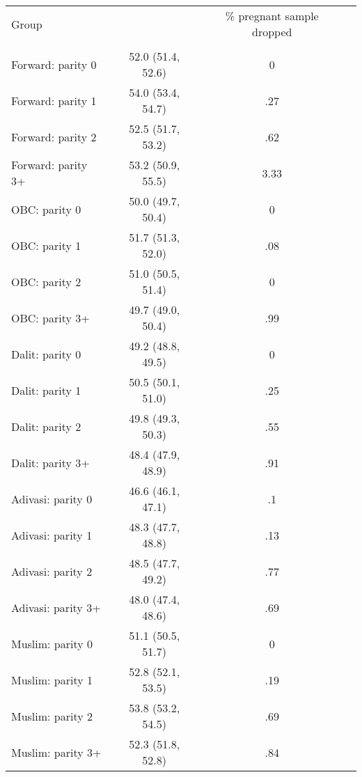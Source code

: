 \begin{tabular}{lccc}
\toprule
Group &  & \% pregnant sample dropped \\\\
\midrule
Forward: parity 0&52.0 (51.4, 52.6)&0\\
Forward: parity 1&54.0 (53.4, 54.7)&.27\\
Forward: parity 2&52.5 (51.7, 53.2)&.62\\
Forward: parity 3+&53.2 (50.9, 55.5)&3.33\\
OBC: parity 0&50.0 (49.7, 50.4)&0\\
OBC: parity 1&51.7 (51.3, 52.0)&.08\\
OBC: parity 2&51.0 (50.5, 51.4)&0\\
OBC: parity 3+&49.7 (49.0, 50.4)&.99\\
Dalit: parity 0&49.2 (48.8, 49.5)&0\\
Dalit: parity 1&50.5 (50.1, 51.0)&.25\\
Dalit: parity 2&49.8 (49.3, 50.3)&.55\\
Dalit: parity 3+&48.4 (47.9, 48.9)&.91\\
Adivasi: parity 0&46.6 (46.1, 47.1)&.1\\
Adivasi: parity 1&48.3 (47.7, 48.8)&.13\\
Adivasi: parity 2&48.5 (47.7, 49.2)&.77\\
Adivasi: parity 3+&48.0 (47.4, 48.6)&.69\\
Muslim: parity 0&51.1 (50.5, 51.7)&0\\
Muslim: parity 1&52.8 (52.1, 53.5)&.19\\
Muslim: parity 2&53.8 (53.2, 54.5)&.69\\
Muslim: parity 3+&52.3 (51.8, 52.8)&.84\\
\bottomrule
\end{tabular}
